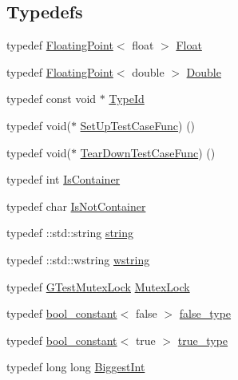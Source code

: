 \subsection*{Typedefs}
\begin{DoxyCompactItemize}
\item 
typedef \hyperlink{classtesting_1_1internal_1_1_floating_point}{Floating\+Point}$<$ float $>$ \hyperlink{namespacetesting_1_1internal_a02e1981f5ff70609e6ac06e006ff519a}{Float}
\item 
typedef \hyperlink{classtesting_1_1internal_1_1_floating_point}{Floating\+Point}$<$ double $>$ \hyperlink{namespacetesting_1_1internal_a66a7579b1893b260c31dad577f7a5c48}{Double}
\item 
typedef const void $\ast$ \hyperlink{namespacetesting_1_1internal_ab1114197d3c657d8b7f8e0c5caa12d00}{Type\+Id}
\item 
typedef void($\ast$ \hyperlink{namespacetesting_1_1internal_a30037044c0b57cdd647c7e2e97cb2cff}{Set\+Up\+Test\+Case\+Func}) ()
\item 
typedef void($\ast$ \hyperlink{namespacetesting_1_1internal_a085e31321d0d029c04d2a79234f60c1a}{Tear\+Down\+Test\+Case\+Func}) ()
\item 
typedef int \hyperlink{namespacetesting_1_1internal_ad8f0c2883245f1df2a53618a49f0deb3}{Is\+Container}
\item 
typedef char \hyperlink{namespacetesting_1_1internal_abf080521ce135deb510e0a7830fd3d33}{Is\+Not\+Container}
\item 
typedef \+::std\+::string \hyperlink{namespacetesting_1_1internal_a8e8ff5b11e64078831112677156cb111}{string}
\item 
typedef \+::std\+::wstring \hyperlink{namespacetesting_1_1internal_a3f543179329c353aee1d7b54a9a8e335}{wstring}
\item 
typedef \hyperlink{classtesting_1_1internal_1_1_g_test_mutex_lock}{G\+Test\+Mutex\+Lock} \hyperlink{namespacetesting_1_1internal_a08b187c6cc4e28400aadf9a32fccc8de}{Mutex\+Lock}
\item 
typedef \hyperlink{structtesting_1_1internal_1_1bool__constant}{bool\+\_\+constant}$<$ false $>$ \hyperlink{namespacetesting_1_1internal_abb1d0789f19bdde21affccbd1078b525}{false\+\_\+type}
\item 
typedef \hyperlink{structtesting_1_1internal_1_1bool__constant}{bool\+\_\+constant}$<$ true $>$ \hyperlink{namespacetesting_1_1internal_a62f917c3424d8841de9b49b5ec28edb4}{true\+\_\+type}
\item 
typedef long long \hyperlink{namespacetesting_1_1internal_a05c6bd9ede5ccdf25191a590d610dcc6}{Biggest\+Int}

\end{DoxyCompactItemize}
